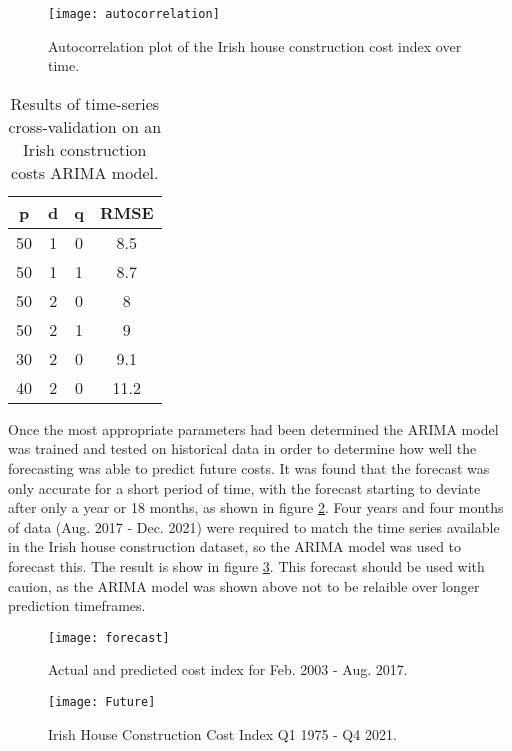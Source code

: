 \documentclass[hidelinks,12pt,oneside]{report} %
\begin{document}
\begin{figure}[!ht]
	\centering
	\vspace{.4218cm}
		\texttt{[image: autocorrelation]}	\captionsetup{justification=justified,width=1\linewidth}
	\caption{Autocorrelation plot of the Irish house construction cost index over time.}
\label{fig:autocorrelation}
\end{figure}

\begin{table}[h!]
\centering
\begin{tabular}{||c | c | c | c ||} 
 \hline
 p & d & q & RMSE \\ [0.0ex] 
 \hline\hline
 50 & 1 & 0 & 8.5 \\ 
 \hline
 50 & 1 & 1 & 8.7 \\
 \hline
 50 & 2 & 0 & 8 \\
 \hline
  50 & 2 & 1 & 9 \\
  \hline
  30 & 2 & 0 & 9.1 \\
  \hline
  40 & 2 & 0 & 11.2 \\ [0.0ex] 
 \hline
\end{tabular}
\caption{Results of time-series cross-validation on an Irish construction costs ARIMA model.}
\label{table:1}
\end{table}

Once the most appropriate parameters had been determined the ARIMA model was trained and tested on historical data in order to determine how well the forecasting was able to predict future costs. It was found that the forecast was only accurate for a short period of time, with the forecast starting to deviate after only a year or 18 months, as shown in figure \ref{fig:forecast}. Four years and four months of data (Aug. 2017 - Dec. 2021) were required to match the time series available in the Irish house construction dataset, so the ARIMA model was used to forecast this. The result is show in figure \ref{fig:future}. This forecast should be used with cauion, as the ARIMA model was shown above not to be relaible over longer prediction timeframes.

\begin{figure}[!ht]
	\centering
	\vspace{.4218cm}
		\texttt{[image: forecast]}	\captionsetup{justification=justified,width=1\linewidth}
	\caption{Actual and predicted cost index for Feb. 2003 - Aug. 2017.}
\label{fig:forecast}
\end{figure}

\begin{figure}[!ht]
	\centering
	\vspace{.4218cm}
		\texttt{[image: Future]}	\captionsetup{justification=justified,width=1\linewidth}
	\caption{Irish House Construction Cost Index Q1 1975 - Q4 2021.}
\label{fig:future}
\end{figure}
\end{document}

